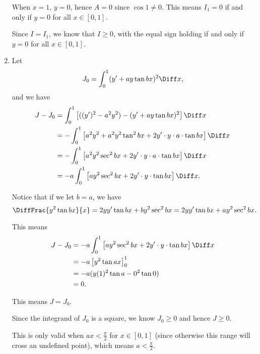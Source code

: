 \begin{enumerate}
          When \(x = 1\), \(y = 0\), hence \(A = 0\) since \(\cos 1 \neq 0\). This means \(I_1 = 0\) if and only if \(y = 0\) for all \(x \in [0, 1]\).

          Since \(I = I_1\), we know that \(I \geq 0\), with the equal sign holding if and only if \(y = 0\) for all \(x \in [0, 1]\).

    \item Let
          \[
              J_0 = \int_{0}^{1} (y' + ay\tan bx)^2 \Diff x,
          \]
          and we have
          \begin{align*}
              J - J_0 & = \int_{0}^{1} \left[((y')^2 - a^2 y^2) - (y' + ay\tan bx)^2\right] \Diff x                           \\
                      & = -\int_{0}^{1} \left[a^2 y^2 + a^2 y^2 \tan^2 bx + 2y' \cdot y \cdot a \cdot \tan bx \right] \Diff x \\
                      & = -\int_{0}^{1} \left[a^2 y^2 \sec^2 bx + 2y' \cdot y \cdot a \cdot \tan bx \right] \Diff x           \\
                      & = -a \int_{0}^{1} \left[a y^2 \sec^2 bx + 2y' \cdot y \cdot \tan bx \right] \Diff x.
          \end{align*}

          Notice that if we let \(b = a\), we have
          \[
              \DiffFrac{y^2 \tan bx}{x} = 2y y' \tan bx + b y^2 \sec^2 bx = 2y y' \tan bx + a y^2 \sec^2 bx.
          \]

          This means
          \begin{align*}
              J - J_0 & = -a \int_{0}^{1} \left[a y^2 \sec^2 bx + 2y' \cdot y \cdot \tan bx \right] \Diff x \\
                      & = -a \left[y^2 \tan ax\right]_{0}^{1}                                               \\
                      & = -a (y(1)^2 \tan a - 0^2 \tan 0)                                                   \\
                      & = 0.
          \end{align*}

          This means \(J = J_0\).

          Since the integrand of \(J_0\) is a square, we know \(J_0 \geq 0\) and hence \(J \geq 0\).

          This is only valid when \(ax < \frac{\pi}{2}\) for \(x \in [0, 1]\) (since otherwise this range will cross an undefined point), which means \(a < \frac{\pi}{2}\).


\end{enumerate}
